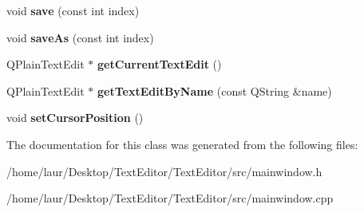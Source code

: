 \begin{DoxyCompactItemize}
\item 
\mbox{\label{class_main_window_abe8f9c1ca4f50e1fef4fd0ef43eeadf5}} 
void {\bfseries save} (const int index)
\item 
\mbox{\label{class_main_window_aebcae2d47fa7668d9053c85d2bc55eea}} 
void {\bfseries save\+As} (const int index)
\item 
\mbox{\label{class_main_window_a6cdeb56a312f6b1935436e6203912c09}} 
Q\+Plain\+Text\+Edit $\ast$ {\bfseries get\+Current\+Text\+Edit} ()
\item 
\mbox{\label{class_main_window_a61d74ea396ffe9c23581f19a3e8368af}} 
Q\+Plain\+Text\+Edit $\ast$ {\bfseries get\+Text\+Edit\+By\+Name} (const Q\+String \&name)
\item 
\mbox{\label{class_main_window_a033947568ce56079791859506f2b2a58}} 
void {\bfseries set\+Cursor\+Position} ()
\end{DoxyCompactItemize}


The documentation for this class was generated from the following files\+:\begin{DoxyCompactItemize}
\item 
/home/laur/\+Desktop/\+Text\+Editor/\+Text\+Editor/src/mainwindow.\+h\item 
/home/laur/\+Desktop/\+Text\+Editor/\+Text\+Editor/src/mainwindow.\+cpp\end{DoxyCompactItemize}
